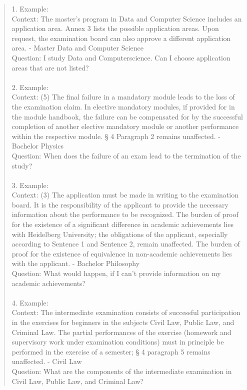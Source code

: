 \begin{quote}
    1. Example:\\
        Context: The master's program in Data and Computer Science includes an application area. Annex 3 lists the possible application areas. Upon request, the examination board can also approve a different application area. - Master Data and Computer Science \\
        Question: I study Data and Computerscience. Can I choose application areas that are not listed? \\ \\
    2. Example: \\
        Context: (5) The final failure in a mandatory module leads to the loss of the examination claim. In elective mandatory modules, if provided for in the module handbook, the failure can be compensated for by the successful completion of another elective mandatory module or another performance within the respective module. § 4 Paragraph 2 remains unaffected. - Bachelor Physics \\
        Question: When does the failure of an exam lead to the termination of the study? \\ \\
    3. Example: \\
        Context: (3) The application must be made in writing to the examination board. It is the responsibility of the applicant to provide the necessary information about the performance to be recognized. The burden of proof for the existence of a significant difference in academic achievements lies with Heidelberg University; the obligations of the applicant, especially according to Sentence 1 and Sentence 2, remain unaffected. The burden of proof for the existence of equivalence in non-academic achievements lies with the applicant. - Bachelor Philosophy \\
        Question: What would happen, if I can't provide information on my academic achievements?\\ \\
    4. Example: \\
        Context: The intermediate examination consists of successful participation in the exercises for beginners in the subjects Civil Law, Public Law, and Criminal Law. The partial performances of the exercise (homework and supervisory work under examination conditions) must in principle be performed in the exercise of a semester; § 4 paragraph 5 remains unaffected. - Civil Law\\
        Question: What are the components of the intermediate examination in Civil Law, Public Law, and Criminal Law? \\
\end{quote}